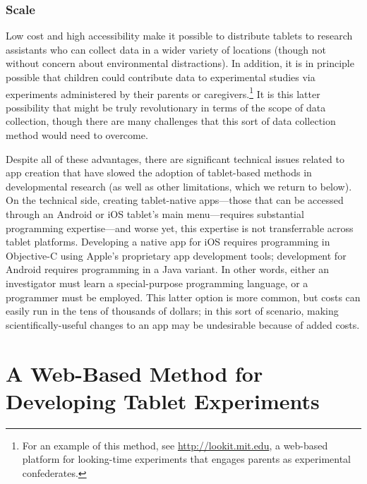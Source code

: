 \documentclass[man,noapacite]{apa2}
\begin{document}
\subsubsection{Scale} Low cost and high accessibility make it possible to distribute tablets to research assistants who can collect data in a wider variety of locations (though not without concern about environmental distractions). In addition, it is in principle possible that children could contribute data to experimental studies via experiments administered by their parents or caregivers.\footnote{For an example of this method, see \url{http://lookit.mit.edu}, a web-based platform for looking-time experiments that engages parents as experimental confederates.} It is this latter possibility that might be truly revolutionary in terms of the scope of data collection, though there are many challenges that this sort of data collection method would need to overcome.

Despite all of these advantages, there are significant technical issues related to app creation that have slowed the adoption of tablet-based methods in developmental research (as well as other limitations, which we return to below). On the technical side, creating tablet-native apps---those that can be accessed through an Android or iOS tablet's main menu---requires substantial programming expertise---and worse yet, this expertise is not transferrable across tablet platforms. Developing a native app for iOS requires programming in Objective-C using Apple's proprietary app development tools; development for Android requires programming in a Java variant. In other words, either an investigator must learn a special-purpose programming language, or a programmer must be employed. This latter option is more common, but costs can easily run in the tens of thousands of dollars; in this sort of scenario, making scientifically-useful changes to an app may be undesirable because of added costs. 

\section{A Web-Based Method for Developing Tablet Experiments}
\end{document}
